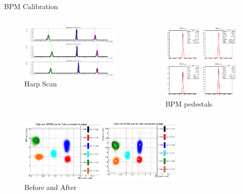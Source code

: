\documentclass{beamer}
\begin{document}
\begin{frame}{BPM Calibration}
	\vspace{-30pt}
	\begin{columns}
		\begin{figure}
			\caption{Harp Scan}
			\vspace{-20pt}
			\includegraphics[width=5.5cm]{../images/harpscan}
		\end{figure}
		\vspace{-10pt}
		\begin{figure}
			\caption{BPM pedestals}
			\vspace{-2pt}
			\includegraphics[width=4.5cm]{../images/BPM_ped}
		\end{figure}
	\end{columns}
	\vspace{-10pt}
	\begin{figure}
		\caption{ Before and After}
		\vspace{-5pt}
		\includegraphics[width=8cm]{../images/BPM_b_a}
	\end{figure}

\end{frame}
\end{document}
